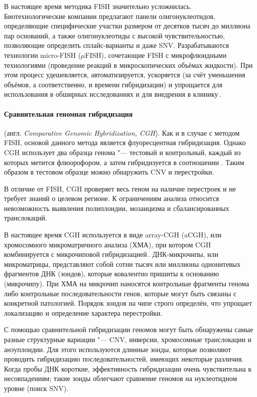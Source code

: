 \documentclass[a4paper,14pt]{extarticle}
\newcommand{\ecitep}[1]{\textenglish{\citep{#1}}}
\newcommand{\engterm}[1]{англ. \textenglish{\textit{#1}}}
\begin{document}
В настоящее время методика FISH значительно усложнилась.
Биотехнологические компании предлагают панели олигонуклеотидов, определяющие специфические участки размером от десятков тысяч до миллиона пар оснований, а также олигонуклеотиды с высокой чувствительностью, позволяющие определить сплайс-варианты и даже SNV.
Разрабатываются технологии micro-FISH ($\mu$FISH), сочетающие FISH с микрофлюидными технологиями (проведение реакций в микроскопических объёмах жидкости).
При этом процесс удешевляется, автоматизируется, ускоряется (за счёт уменьшения объёмов, а соответственно, и времени гибридизации) и упрощается для использования в обширных исследованиях и для внедрения в клинику\,\ecitep{Huber_2018}.

\paragraph{Сравнительная геномная гибридизация} (\engterm{Comparative Genomic Hybridization, CGH}).
Как и в случае с методом FISH, основой данного метода является флуоресцентная гибридизация.
Однако CGH использует два образца генома "--- тестовый и контрольный, каждый из которых метится флюорофором, а затем гибридизуется в соотношении .
Таким образом в тестовом образце можно обнаружить CNV и перестройки.

В отличие от FISH, CGH проверяет весь геном на наличие перестроек и не требует знаний о целевом регионе.
К ограничениям анализа относится невозможность выявления полиплоидии, мозаицизма и сбалансированных транслокаций.

В настоящее время CGH используется в виде array-CGH (aCGH), или хромосомного микроматричного анализа (ХМА), при котором CGH комбинируется с микрочиповой гибридизацией\,\ecitep{Theisen_2008}.
ДНК-микрочипы, или микроматрицы, представляют собой сотни тысяч или миллионы однонитевых фрагментов ДНК (зондов), которые ковалентно пришиты к основанию (микрочипу).
При ХМА на микрочип наносятся контрольные фрагменты генома либо контрольные последовательности генов, которые могут быть связаны с конкретной патологией.
Порядок зондов на чипе строго определён, что упрощает локализацию и определение характера перестройки.

С помощью сравнительной гибридизации геномов могут быть обнаружены самые разные структурные вариации "--- CNV, инверсии, хромосомные транслокации и анэуплоидии.
Для этого используются длинные зонды, которые позволяют проводить гибридизацию последовательностей, имеющих некоторые различия.
Когда пробы ДНК короткие, эффективность гибридизации очень чувствительна к несовпадениям; такие зонды облегчают сравнение геномов на нуклеотидном уровне (поиск SNV).
\end{document}
